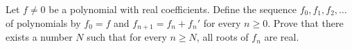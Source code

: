 \documentclass{article}
\begin{document}
\setlength{\parindent}{0pt}
Let $f\ne0$ be a polynomial with real coefficients. Define the sequence $f_{0},f_{1},f_{2},\dots$ of polynomials by $f_{0}=f$ and $f_{n+1}=f_{n}+f_{n}'$ for every $n\ge0$. Prove that there exists a number $N$ such that for every $n\ge N$, all roots of $f_{n}$ are real.
\end{document}
